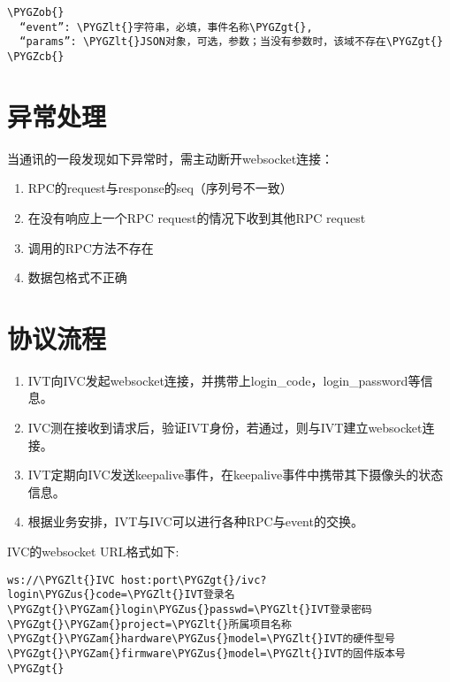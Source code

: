\documentclass[letterpaper,10pt,english]{sphinxmanual}
\def\PYGZus{\char`\_}
\def\PYGZob{\char`\{}
\def\PYGZcb{\char`\}}
\def\PYGZam{\char`\&}
\def\PYGZlt{\char`\<}
\def\PYGZgt{\char`\>}
\begin{document}
\begin{Verbatim}[commandchars=\\\{\}]
\PYGZob{}
  “event”: \PYGZlt{}字符串，必填，事件名称\PYGZgt{},
  “params”: \PYGZlt{}JSON对象，可选，参数；当没有参数时，该域不存在\PYGZgt{}
\PYGZcb{}
\end{Verbatim}


\section{异常处理}
\label{rpc:id6}
当通讯的一段发现如下异常时，需主动断开websocket连接：
\begin{enumerate}
\item {} 
RPC的request与response的seq（序列号不一致）

\item {} 
在没有响应上一个RPC request的情况下收到其他RPC request

\item {} 
调用的RPC方法不存在

\item {} 
数据包格式不正确

\end{enumerate}


\section{协议流程}
\label{rpc:id7}\begin{enumerate}
\item {} 
IVT向IVC发起websocket连接，并携带上login\_code，login\_password等信息。

\item {} 
IVC测在接收到请求后，验证IVT身份，若通过，则与IVT建立websocket连接。

\item {} 
IVT定期向IVC发送keepalive事件，在keepalive事件中携带其下摄像头的状态信息。

\item {} 
根据业务安排，IVT与IVC可以进行各种RPC与event的交换。

\end{enumerate}

IVC的websocket URL格式如下:

\begin{Verbatim}[commandchars=\\\{\}]
ws://\PYGZlt{}IVC host:port\PYGZgt{}/ivc? login\PYGZus{}code=\PYGZlt{}IVT登录名\PYGZgt{}\PYGZam{}login\PYGZus{}passwd=\PYGZlt{}IVT登录密码\PYGZgt{}\PYGZam{}project=\PYGZlt{}所属项目名称\PYGZgt{}\PYGZam{}hardware\PYGZus{}model=\PYGZlt{}IVT的硬件型号\PYGZgt{}\PYGZam{}firmware\PYGZus{}model=\PYGZlt{}IVT的固件版本号\PYGZgt{}
\end{Verbatim}
\end{document}
